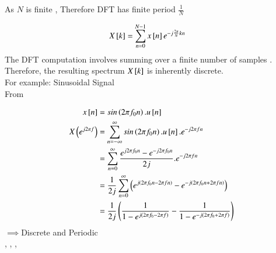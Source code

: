 \documentclass[journal,12pt,onecolumn]{IEEEtran}
\theoremstyle{remark}
\begin{document}
As $N$ is finite , Therefore DFT has finite period $\frac{1}{N}$

\begin{align}
X{}\left[k\right]&=\sum_{n=0}^{N-1}x{}\left[n\right]e^{-j\frac{2\pi}{N}kn}
\end{align}
The DFT computation involves summing over a finite number of samples . Therefore, the resulting spectrum  $X{}\left[k\right]$ is inherently discrete.\\

For example:  Sinusoidal Signal\\

From 

\begin{align}
x{}\left[n\right]&=sin\left(2\pi f_0n\right).u{}\left[n\right]\\
X\left(e^{j2\pi f}\right)&= \sum_{n=-\infty}^{\infty} sin\left(2\pi f_0n\right).u{}\left[n\right].e^{-j2\pi fn}\\
&= \sum_{n=0}^{\infty} \frac{e^{j2\pi f_0n}- e^{-j2\pi f_0n}}{2j}. e^{-j2\pi fn}\\
&=\frac{1}{2j}\sum_{n=0}^{\infty} \left(e^{j\left(2\pi f_0n-2\pi fn\right)} -  e^{-j\left(2\pi f_0n+2\pi fn\right)} \right)\\
&= \frac{1}{2j} \left(\frac{1}{1-e^{j\left(2\pi f_0-2\pi f\right)}}  -  \frac{1}{1-e^{-j\left(2\pi f_0+ 2\pi f\right)}}\right)
\end{align}
$\implies$Discrete and Periodic \\

 \textrightarrow {}   ,   \textrightarrow {}   ,    \textrightarrow {}   ,    \textrightarrow {}
\end{document}
